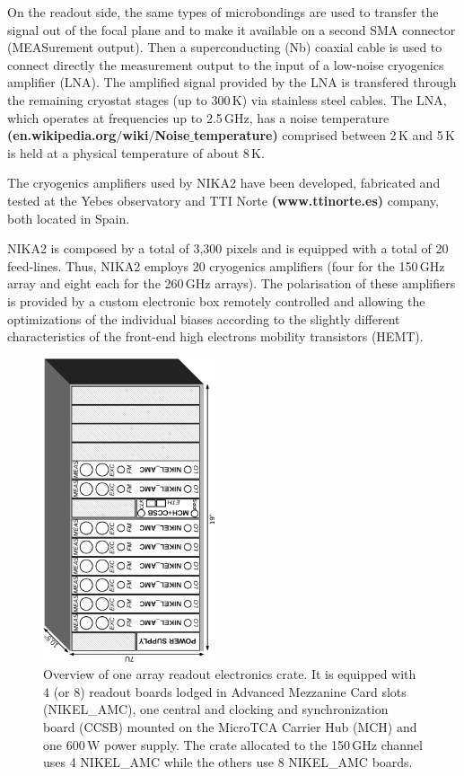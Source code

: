 \documentclass[]{aa} %
\begin{document}
On the readout side, the same types of microbondings are used to transfer the signal out of the focal plane and to make it available on a second SMA connector (MEASurement output). Then a superconducting (Nb) coaxial cable is used to connect directly the measurement output to the input of a low-noise cryogenics amplifier (LNA). The amplified signal provided by the LNA is transfered through the remaining cryostat stages (up to 300\,K) via stainless steel cables. 
The LNA, which operates at frequencies up to 2.5\,GHz, has  a noise temperature \textbf{(en.wikipedia.org$/$wiki$/$Noise$\_$temperature)} comprised between 2\,K and 5\,K is held at a physical temperature of about 8\,K.

The cryogenics amplifiers used by NIKA2 have been developed, fabricated and tested at the Yebes observatory and TTI Norte \textbf{(www.ttinorte.es)} company, both located in Spain. 

NIKA2 is composed by a total of 3,300 pixels and is equipped with a total of 20 feed-lines. Thus, NIKA2 employs 20 cryogenics amplifiers (four for the 150\,GHz array and eight each for the 260\,GHz arrays). The polarisation of these amplifiers is provided by a custom electronic box remotely controlled and allowing the optimizations of the individual biases according to the slightly different characteristics of the front-end high electrons mobility transistors (HEMT). 

\begin{figure}
\begin{center}
\includegraphics[angle=-90,width=0.45\textwidth]{NIKA_crate}
\caption{Overview of one array readout electronics crate.
It is equipped with 4 (or 8) readout boards lodged in Advanced Mezzanine Card slots (NIKEL\_AMC), one central and clocking and synchronization board (CCSB) mounted on the MicroTCA Carrier Hub (MCH) and one 600\,W power supply.
The crate allocated to the 150\,GHz channel uses 4 NIKEL\_AMC while the others use 8 NIKEL\_AMC boards.
\label{crateFig}}
\end{center}
\end{figure}
\end{document}
